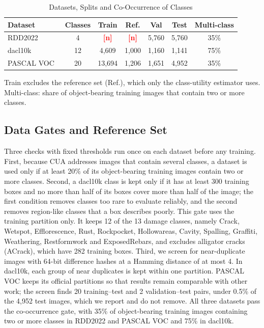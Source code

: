 \documentclass[conference]{IEEEtran}
\newcommand{\todo}[1]{\textcolor{red}{\textbf{[#1]}}}
\begin{document}
\begin{table}[t]
\caption{Datasets, Splits and Co-Occurrence of Classes}
\label{tab:datasets}
\centering
\footnotesize
\setlength{\tabcolsep}{3pt}
\begin{tabular}{@{}lcccccc@{}}
\toprule
\textbf{Dataset} & \textbf{Classes} & \textbf{Train} & \textbf{Ref.} & \textbf{Val} & \textbf{Test} & \textbf{Multi-class} \\
\midrule
RDD2022~\cite{arya2024rdd} & 4 & \todo{n} & \todo{n} & 5,760 & 5,760 & 35\% \\
dacl10k~\cite{flotzinger2024dacl10k} & 12 & 4,609 & 1,000 & 1,160 & 1,141 & 75\% \\
PASCAL VOC~\cite{everingham2010voc} & 20 & 13,694 & 1,206 & 1,651 & 4,952 & 35\% \\
\bottomrule
\end{tabular}
\vspace{2pt}

\parbox{\columnwidth}{\footnotesize Train excludes the reference set (Ref.), which only the class-utility estimator uses. Multi-class: share of object-bearing training images that contain two or more classes.}
\end{table}

\subsection{Data Gates and Reference Set}
\label{sec:setup_gates}

Three checks with fixed thresholds run once on each dataset before any training. First, because CUA addresses images that contain several classes, a dataset is used only if at least 20\% of its object-bearing training images contain two or more classes. Second, a dacl10k class is kept only if it has at least 300 training boxes and no more than half of its boxes cover more than half of the image; the first condition removes classes too rare to evaluate reliably, and the second removes region-like classes that a box describes poorly. This gate uses the training partition only. It keeps 12 of the 13 damage classes, namely Crack, Wetspot, Efflorescence, Rust, Rockpocket, Hollowareas, Cavity, Spalling, Graffiti, Weathering, Restformwork and ExposedRebars, and excludes alligator cracks (ACrack), which have 282 training boxes. Third, we screen for near-duplicate images with 64-bit difference hashes at a Hamming distance of at most 4. In dacl10k, each group of near duplicates is kept within one partition. PASCAL VOC keeps its official partitions so that results remain comparable with other work; the screen finds 20 training--test and 2 validation--test pairs, under 0.5\% of the 4,952 test images, which we report and do not remove. All three datasets pass the co-occurrence gate, with 35\% of object-bearing training images containing two or more classes in RDD2022 and PASCAL VOC and 75\% in dacl10k.
\end{document}
